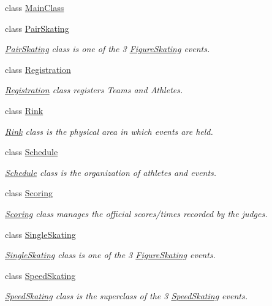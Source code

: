 \begin{DoxyCompactItemize}
class \hyperlink{classPCO_1_1MainClass}{Main\+Class}
\item 
class \hyperlink{classPCO_1_1PairSkating}{Pair\+Skating}
\begin{DoxyCompactList}\small\item\em \hyperlink{classPCO_1_1PairSkating}{Pair\+Skating} class is one of the 3 \hyperlink{classPCO_1_1FigureSkating}{Figure\+Skating} events. \end{DoxyCompactList}\item 
class \hyperlink{classPCO_1_1Registration}{Registration}
\begin{DoxyCompactList}\small\item\em \hyperlink{classPCO_1_1Registration}{Registration} class registers Teams and Athletes. \end{DoxyCompactList}\item 
class \hyperlink{classPCO_1_1Rink}{Rink}
\begin{DoxyCompactList}\small\item\em \hyperlink{classPCO_1_1Rink}{Rink} class is the physical area in which events are held. \end{DoxyCompactList}\item 
class \hyperlink{classPCO_1_1Schedule}{Schedule}
\begin{DoxyCompactList}\small\item\em \hyperlink{classPCO_1_1Schedule}{Schedule} class is the organization of athletes and events. \end{DoxyCompactList}\item 
class \hyperlink{classPCO_1_1Scoring}{Scoring}
\begin{DoxyCompactList}\small\item\em \hyperlink{classPCO_1_1Scoring}{Scoring} class manages the official scores/times recorded by the judges. \end{DoxyCompactList}\item 
class \hyperlink{classPCO_1_1SingleSkating}{Single\+Skating}
\begin{DoxyCompactList}\small\item\em \hyperlink{classPCO_1_1SingleSkating}{Single\+Skating} class is one of the 3 \hyperlink{classPCO_1_1FigureSkating}{Figure\+Skating} events. \end{DoxyCompactList}\item 
class \hyperlink{classPCO_1_1SpeedSkating}{Speed\+Skating}
\begin{DoxyCompactList}\small\item\em \hyperlink{classPCO_1_1SpeedSkating}{Speed\+Skating} class is the superclass of the 3 \hyperlink{classPCO_1_1SpeedSkating}{Speed\+Skating} events. \end{DoxyCompactList}\item 

\end{DoxyCompactItemize}

